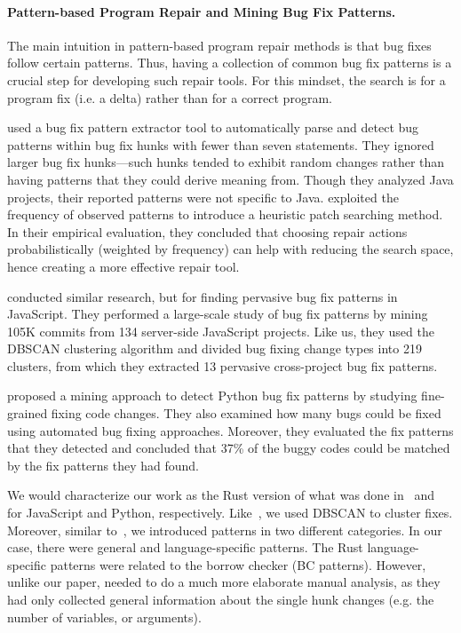 \paragraph{Pattern-based Program Repair and Mining Bug Fix Patterns.}
The main intuition in pattern-based program repair methods is that bug fixes follow certain patterns. Thus, having a collection of common bug fix patterns is a crucial step for developing such repair tools. For this mindset, the search is for a program fix (i.e. a delta) rather than for a correct program.

\cite{pan2009toward} used a bug fix pattern extractor tool to automatically parse and detect bug patterns within bug fix hunks with fewer than seven statements. They ignored larger bug fix hunks---such hunks tended to exhibit random changes rather than having patterns that they could derive meaning from. Though they analyzed Java projects, their reported patterns were not specific to Java. \cite{martinez2015mining,martinez2012mining} exploited the frequency of observed patterns to introduce a heuristic patch searching method. In their empirical evaluation, they concluded that choosing repair actions probabilistically (weighted by frequency) can help with reducing the search space, hence creating a more effective repair tool.

\cite{hanam2016discovering} conducted similar research, but for finding pervasive bug fix patterns in JavaScript. They performed a large-scale study of bug fix patterns by mining 105K commits from 134 server-side JavaScript projects. Like us, they used the DBSCAN clustering algorithm and divided bug fixing change types into 219 clusters, from which they extracted 13 pervasive cross-project bug fix patterns. 

\cite{yang2022mining} proposed a mining approach to detect Python bug fix patterns by studying fine-grained fixing code changes. They also examined how many bugs could be fixed using automated bug fixing approaches. Moreover, they evaluated the fix patterns that they detected and concluded that 37\% of the buggy codes could be matched by the fix patterns they had found. 

We would characterize our work as the Rust version of what was done in~\cite{hanam2016discovering} and~\cite{yang2022mining} for JavaScript and Python, respectively. Like~\cite{hanam2016discovering}, we used DBSCAN to cluster fixes. Moreover, similar to~\cite{yang2022mining}, we introduced patterns in two different categories. In our case, there were general and language-specific patterns. The Rust language-specific patterns were related to the borrow checker (BC patterns). However, unlike our paper, \cite{yang2022mining} needed to do a much more elaborate manual analysis, as they had only collected general information about the single hunk changes (e.g. the number of variables, or arguments).

